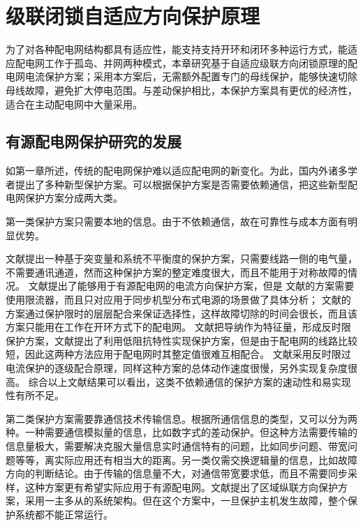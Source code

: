 \chapter{级联闭锁自适应方向保护原理}

为了对各种配电网结构都具有适应性，能支持支持开环和闭环多种运行方式，能适应配电网工作于孤岛、并网两种模式，本章研究基于自适应级联方向闭锁原理的配电网电流保护方案；采用本方案后，无需额外配置专门的母线保护，能够快速切除母线故障，避免扩大停电范围。与差动保护相比，本保护方案具有更优的经济性，适合在主动配电网中大量采用。

\section{有源配电网保护研究的发展}

如第一章所述，传统的配电网保护难以适应配电网的新变化。为此，国内外诸多学者提出了多种新型保护方案。可以根据保护方案是否需要依赖通信，把这些新型配电网保护方案分成两大类。

第一类保护方案只需要本地的信息。由于不依赖通信，故在可靠性与成本方面有明显优势。

文献\cite{ganzhong2002shu}提出一种基于突变量和系统不平衡度的保护方案，只需要线路一侧的电气量，不需要通讯通道，然而这种保护方案的整定难度很大，而且不能用于对称故障的情况。
文献\cite{zamani2011protection,najy2013optimal,hsieh2014adaptive,zeineldin2015optimal}提出了能够用于有源配电网的电流方向保护方案，但是
文献\cite{najy2013optimal}的方案需要使用限流器，而且只对应用于同步机型分布式电源的场景做了具体分析；
文献\cite{zamani2011protection}的方案通过保护限时的层层配合来保证选择性，这样故障切除的时间会很长，而且该方案只能用在工作在开环方式下的配电网。
文献\cite{dewadasa2010fold}把导纳作为特征量，形成反时限保护方案，文献\cite{wentao2014wei}提出了利用低阻抗特性实现保护方案，但是由于配电网的线路比较短，因此这两种方法应用于配电网时其整定值很难互相配合。
文献\cite{hsieh2014adaptive,zeineldin2015optimal}采用反时限过电流保护的逐级配合原理，同样这种方案的总体动作速度很慢，另外实现复杂度很高。
综合以上文献结果可以看出，这类不依赖通信的保护方案的速动性和易实现性有所不足。

第二类保护方案需要靠通信技术传输信息。根据所通信信息的类型，又可以分为两种。一种需要通信模拟量的信息，比如数字式的差动保护\cite{qing2014recent}。但这种方法需要传输的信息量极大，需要解决克服大量信息实时通信特有的问题，比如同步问题、带宽问题等等，离实际应用还有相当大的距离。另一类仅需交换逻辑量的信息，比如故障方向的判断结论。由于传输的信息量不大，对通信带宽要求低，而且不需要同步采样，这种方案更有希望实际应用于有源配电网。文献\cite{wangwei2009}提出了区域纵联方向保护方案，采用一主多从的系统架构。但在这个方案中，一旦保护主机发生故障，整个保护系统都不能正常运行。

